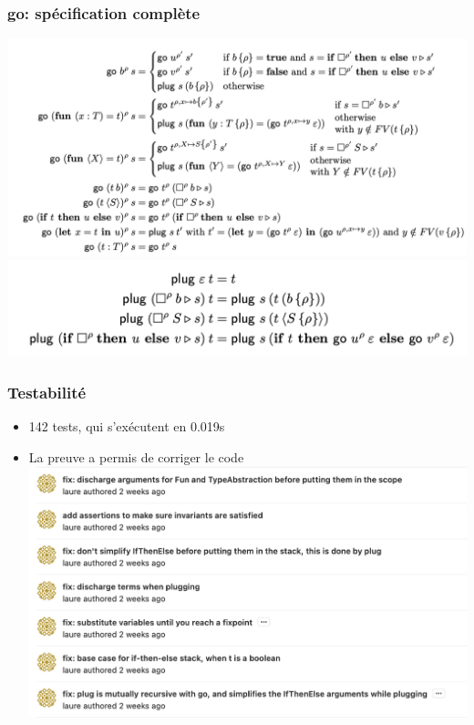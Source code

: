 \documentclass{beamer}
\begin{document}
\begin{frame}
\frametitle{go: spécification complète}
\includegraphics[scale=0.2]{pics/go_spec.png}
\includegraphics[scale=0.5]{pics/plug_spec.png}
\end{frame}
\begin{frame}
\frametitle{Testabilité}
\begin{itemize}
    \item 142 tests, qui s’exécutent en 0.019s
    \item La preuve a permis de corriger le code
\includegraphics[scale=0.25]{pics/bug_fix_commits.png}
\end{itemize}
\end{frame}
\end{document}
